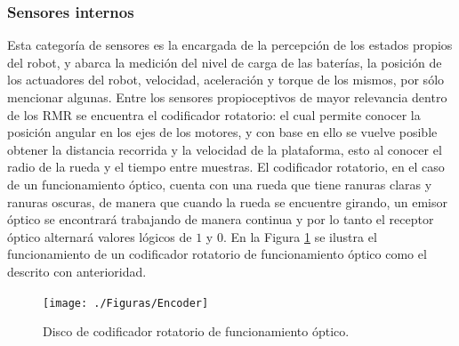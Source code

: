 \subsubsection{Sensores internos}
\label{sssec:si}
Esta categoría de sensores es la encargada de la percepción de los estados propios del robot, y abarca la medición del nivel de carga de las baterías, la posición de los actuadores del robot, velocidad, aceleración y torque de los mismos, por sólo mencionar algunas. Entre los sensores propioceptivos de mayor relevancia dentro de los RMR se encuentra el codificador rotatorio: el cual permite conocer la posición angular en los ejes de los motores, y con base en ello se vuelve posible obtener la distancia recorrida y la velocidad de la plataforma, esto al conocer el radio de la rueda y el tiempo entre muestras. El codificador rotatorio, en el caso de un funcionamiento óptico, cuenta con una rueda que tiene ranuras claras y ranuras oscuras, de manera que cuando la rueda se encuentre girando, un emisor óptico se encontrará trabajando de manera continua y por lo tanto el receptor óptico alternará valores lógicos de $1$ y $0$. En la Figura \ref{fig:CRO} se ilustra el funcionamiento de un codificador rotatorio de funcionamiento óptico como el descrito con anterioridad.
\begin{figure}[htbp!]
	\centering
	\texttt{[image: ./Figuras/Encoder]}
	\caption{Disco de codificador rotatorio de funcionamiento óptico.}
	\label{fig:CRO}
\end{figure}
